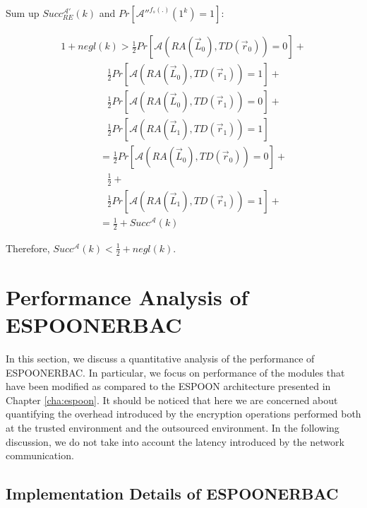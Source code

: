 \documentclass[epsfig,a4paper,11pt,titlepage]{book}
\numberwithin{algorithm}{chapter}
\begin{document}
Sum up $Succ_{RE}^{\mathcal{A}'}(k)$ and $Pr[\mathcal{A}''^{f_{s}(.)}(1^k) = 1]$:

\begin{equation}
\begin{array}{l}
1 + negl(k) >  \frac{1}{2} Pr[\mathcal{A}(RA(\vec{L}_0), TD(\vec{r}_0)) = 0] + \\
\hspace{56pt}\frac{1}{2} Pr[\mathcal{A}(RA(\vec{L}_0), TD(\vec{r}_1)) = 1] + \\
\hspace{56pt}\frac{1}{2} Pr[\mathcal{A}(RA(\vec{L}_0), TD(\vec{r}_1)) = 0]+ \\
\hspace{56pt}\frac{1}{2} Pr[\mathcal{A}(RA(\vec{L}_1), TD(\vec{r}_1)) = 1] \\
\hspace{47pt} = \frac{1}{2} Pr[\mathcal{A}(RA(\vec{L}_0), TD(\vec{r}_0)) = 0] + \\
\hspace{56pt}\frac{1}{2} + \\
\hspace{56pt}\frac{1}{2} Pr[\mathcal{A}(RA(\vec{L}_1), TD(\vec{r}_1)) = 1] + \\
\hspace{47pt} = \frac{1}{2} + Succ^{\mathcal{A}}(k)
\end{array}
\end{equation}

Therefore, $Succ^{\mathcal{A}}(k)< \frac{1}{2} + negl(k)$.

\section[Performance Analysis of ESPOON$_{\mathit{ERBAC}}$]{Performance Analysis of \gls{ESPOONERBAC}}
\label{sec:erbac-performance-analysis}
In this section, we discuss a quantitative analysis of the performance of \gls{ESPOONERBAC}. In particular, we focus on performance of the modules that have been modified as compared to the \gls{ESPOON} architecture presented in Chapter \ref{cha:espoon}. It should be noticed that here we are concerned about quantifying the overhead introduced by the encryption operations performed both at the trusted environment and the outsourced environment. In the following discussion, we do not take into account the latency introduced by the network communication.

\subsection[Implementation Details of ESPOON$_{\mathit{ERBAC}}$]{Implementation Details of \gls{ESPOONERBAC}}
\end{document}
